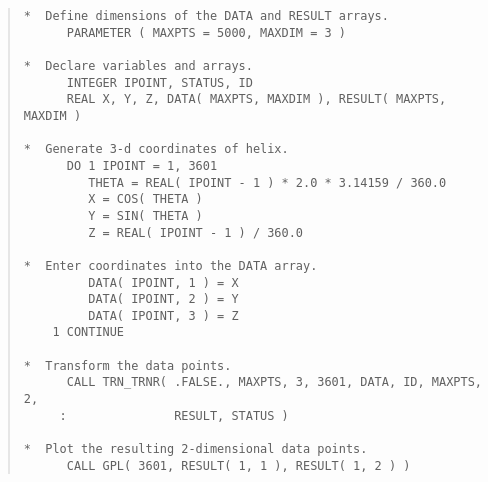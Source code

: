 \begin{quote}
\begin{tabbing} %

\verb#*  Define dimensions of the DATA and RESULT arrays.    #\\
\verb#      PARAMETER ( MAXPTS = 5000, MAXDIM = 3 )          #\\
\verb#                                                       #\\
\verb#*  Declare variables and arrays.                       #\\
\verb#      INTEGER IPOINT, STATUS, ID                       #\\
\verb#      REAL X, Y, Z, DATA( MAXPTS, MAXDIM ), RESULT( MAXPTS, MAXDIM )#\\
\verb#                                                       #\\
\verb#*  Generate 3-d coordinates of helix.                  #\\
\verb#      DO 1 IPOINT = 1, 3601                            #\\
\verb#         THETA = REAL( IPOINT - 1 ) * 2.0 * 3.14159 / 360.0#\\
\verb#         X = COS( THETA )                              #\\
\verb#         Y = SIN( THETA )                              #\\
\verb#         Z = REAL( IPOINT - 1 ) / 360.0                #\\
\verb#                                                       #\\
\verb#*  Enter coordinates into the DATA array.              #\\
\verb#         DATA( IPOINT, 1 ) = X                         #\\
\verb#         DATA( IPOINT, 2 ) = Y                         #\\
\verb#         DATA( IPOINT, 3 ) = Z                         #\\
\verb#    1 CONTINUE                                         #\\
\verb#                                                       #\\
\verb#*  Transform the data points.                          #\\
\verb#      CALL TRN_TRNR( .FALSE., MAXPTS, 3, 3601, DATA, ID, MAXPTS, 2,#\\
\verb#     :               RESULT, STATUS )                  #\\
\verb#                                                       #\\
\verb#*  Plot the resulting 2-dimensional data points.       #\\
\verb#      CALL GPL( 3601, RESULT( 1, 1 ), RESULT( 1, 2 ) ) #

\end{tabbing}
\end{quote}

